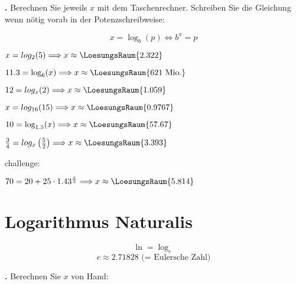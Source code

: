 \newpage

\textbf{\bbwAufgabenNummer{}.}
Berechnen Sie jeweils $x$ mit dem Taschenrechner. Schreiben Sie die
Gleichung wenn nötig vorab in der Potenzschreibweise:

$$x=\log_b(p) \Longleftrightarrow b^x=p$$

\begin{bbwAufgabenBlock}
\item $x=log_2(5) \Longrightarrow x \approx    \LoesungsRaum{2.322}$
\item $11.3 = \log_6(x) \Longrightarrow x \approx    \LoesungsRaum{621 \text{ Mio.}}$
\item $12 = log_x(2) \Longrightarrow x \approx    \LoesungsRaum{1.059}$
\item $x = log_{16}(15)  \Longrightarrow x \approx    \LoesungsRaum{0.9767}$
\item $10 = \log_{1.5}(x)  \Longrightarrow x \approx    \LoesungsRaum{57.67}$
\item $\frac34 = log_{x}\left(\frac52\right)  \Longrightarrow x \approx    \LoesungsRaum{3.393}$\\

\noTRAINER{\newpage}

challenge:

\item $70=20 + 25 \cdot{} 1.43^{\frac{x}3}  \Longrightarrow x \approx    \LoesungsRaum{5.814}$

\end{bbwAufgabenBlock}

\newpage

\section{Logarithmus Naturalis}

$$\ln = \log_e$$
$$e\approx 2.71828 \text{ (= Eulersche Zahl)}$$



\textbf{\bbwAufgabenNummer{}.}
Berechnen Sie $x$ von Hand:

